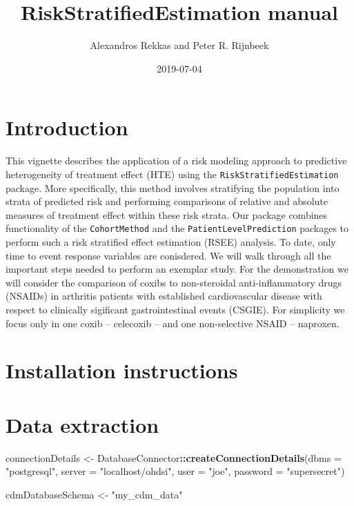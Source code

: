 \documentclass[]{article}
\title{RiskStratifiedEstimation manual}
\author{Alexandros Rekkas and Peter R. Rijnbeek}
\date{2019-07-04}
\newenvironment{Shaded}{\begin{snugshade}}{\end{snugshade}}
\newcommand{\DataTypeTok}[1]{\textcolor[rgb]{0.13,0.29,0.53}{#1}}
\newcommand{\KeywordTok}[1]{\textcolor[rgb]{0.13,0.29,0.53}{\textbf{#1}}}
\newcommand{\NormalTok}[1]{#1}
\newcommand{\OperatorTok}[1]{\textcolor[rgb]{0.81,0.36,0.00}{\textbf{#1}}}
\newcommand{\StringTok}[1]{\textcolor[rgb]{0.31,0.60,0.02}{#1}}
\begin{document}
\maketitle

{
\setcounter{tocdepth}{2}
\tableofcontents
}
\hypertarget{introduction}{%
\section{Introduction}\label{introduction}}

This vignette describes the application of a risk modeling approach to
predictive heterogeneity of treatment effect (HTE) using the
\texttt{RiskStratifiedEstimation} package. More specifically, this
method involves stratifying the population into strata of predicted risk
and performing comparisons of relative and absolute measures of
treatment effect within these risk strata. Our package combines
functionality of the \texttt{CohortMethod} and the
\texttt{PatientLevelPrediction} packages to perform such a risk
stratified effect estimation (RSEE) analysis. To date, only time to
event response variables are conisdered. We will walk through all the
important steps needed to perform an exemplar study. For the
demonstration we will consider the comparison of coxibs to non-steroidal
anti-inflammatory drugs (NSAIDs) in arthritis patients with established
cardiovascular disease with respect to clinically sigificant
gastrointestinal events (CSGIE). For simplicity we focus only in one
coxib -- celecoxib -- and one non-selective NSAID -- naproxen.

\hypertarget{installation-instructions}{%
\section{Installation instructions}\label{installation-instructions}}

\hypertarget{data-extraction}{%
\section{Data extraction}\label{data-extraction}}

\begin{Shaded}
\begin{Highlighting}[]
\NormalTok{connectionDetails <-}\StringTok{ }\NormalTok{DatabaseConnector}\OperatorTok{::}\KeywordTok{createConnectionDetails}\NormalTok{(}\DataTypeTok{dbms =} \StringTok{"postgresql"}\NormalTok{,}
                                             \DataTypeTok{server =} \StringTok{"localhost/ohdsi"}\NormalTok{,}
                                             \DataTypeTok{user =} \StringTok{"joe"}\NormalTok{,}
                                             \DataTypeTok{password =} \StringTok{"supersecret"}\NormalTok{)}

\NormalTok{cdmDatabaseSchema <-}\StringTok{ "my_cdm_data"}
\end{Highlighting}
\end{Shaded}
\end{document}
